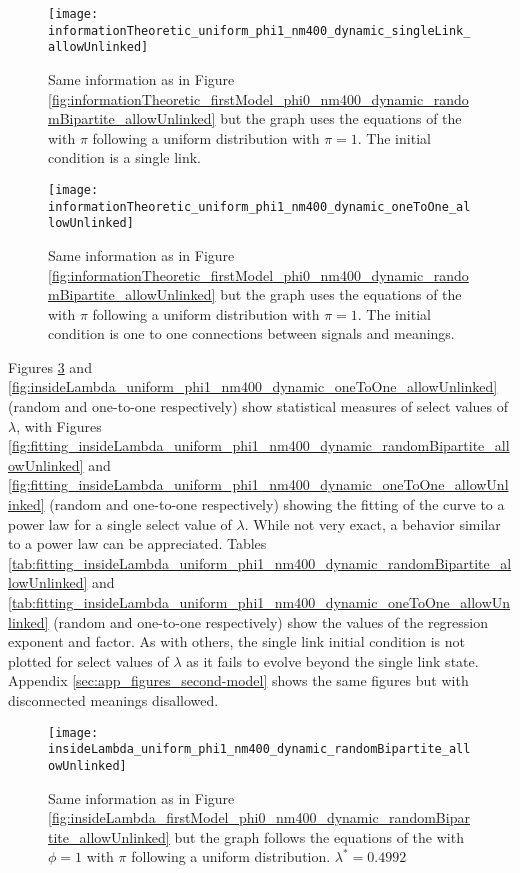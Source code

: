 \begin{figure}
  \centering
  \texttt{[image: informationTheoretic\_uniform\_phi1\_nm400\_dynamic\_singleLink\_allowUnlinked]}
  \caption{Same information as in Figure \ref{fig:informationTheoretic_firstModel_phi0_nm400_dynamic_randomBipartite_allowUnlinked} but the graph uses the equations of the \secondmodel{} with $\pi$ following a uniform distribution with $\pi=1$.
The initial condition is a single link.}
  \label{fig:informationTheoretic_uniform_phi1_nm400_dynamic_singleLink_allowUnlinked}
\end{figure}

\begin{figure}
  \centering
  \texttt{[image: informationTheoretic\_uniform\_phi1\_nm400\_dynamic\_oneToOne\_allowUnlinked]}
  \caption{Same information as in Figure \ref{fig:informationTheoretic_firstModel_phi0_nm400_dynamic_randomBipartite_allowUnlinked} but the graph uses the equations of the \secondmodel{} with $\pi$ following a uniform distribution with $\pi=1$.
The initial condition is one to one connections between signals and meanings.}
  \label{fig:informationTheoretic_uniform_phi1_nm400_dynamic_oneToOne_allowUnlinked}
\end{figure}

Figures \ref{fig:insideLambda_uniform_phi1_nm400_dynamic_randomBipartite_allowUnlinked} and \ref{fig:insideLambda_uniform_phi1_nm400_dynamic_oneToOne_allowUnlinked} (random and one-to-one respectively) show statistical measures of select values of $\lambda$, with Figures \ref{fig:fitting_insideLambda_uniform_phi1_nm400_dynamic_randomBipartite_allowUnlinked} and \ref{fig:fitting_insideLambda_uniform_phi1_nm400_dynamic_oneToOne_allowUnlinked} (random and one-to-one respectively) showing the fitting of the curve to a power law for a single select value of $\lambda$.
While not very exact, a behavior similar to a power law can be appreciated.
Tables \ref{tab:fitting_insideLambda_uniform_phi1_nm400_dynamic_randomBipartite_allowUnlinked} and \ref{tab:fitting_insideLambda_uniform_phi1_nm400_dynamic_oneToOne_allowUnlinked} (random and one-to-one respectively) show the values of the regression exponent and factor.
As with others, the single link initial condition is not plotted for select values of $\lambda$ as it fails to evolve beyond the single link state.
Appendix \ref{sec:app_figures_second-model} shows the same figures but with disconnected meanings disallowed.

\begin{figure}
  \centering
  \texttt{[image: insideLambda\_uniform\_phi1\_nm400\_dynamic\_randomBipartite\_allowUnlinked]}
  \caption{Same information as in Figure \ref{fig:insideLambda_firstModel_phi0_nm400_dynamic_randomBipartite_allowUnlinked} but the graph follows the equations of the \secondmodel{} with $\phi=1$ with $\pi$ following a uniform distribution. $\lambda^* = 0.4992$}
  \label{fig:insideLambda_uniform_phi1_nm400_dynamic_randomBipartite_allowUnlinked}
\end{figure}


